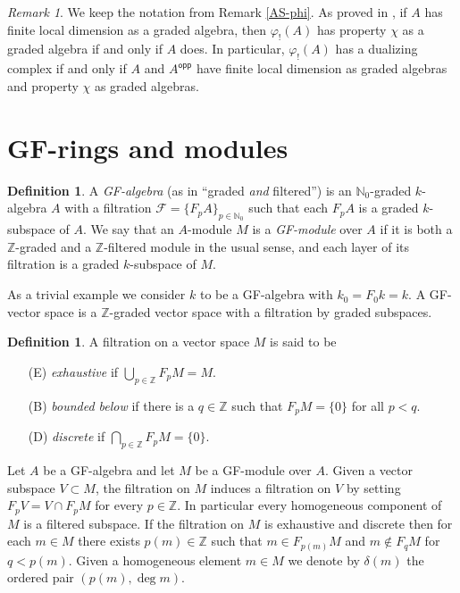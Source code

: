 \documentclass[11pt,fleqn]{article}
\theoremstyle{plain}
\theoremstyle{remark}
\newtheorem{Remark}[Theorem]{Remark}
\theoremstyle{definition}
\newtheorem{Definition}[Theorem]{Definition}
\newcommand\NN{\mathbb N}
\newcommand\ZZ{\mathbb Z}
\renewcommand\phi{\varphi}
\newcommand\F{\mathcal F}
\newcommand\opp{\mathsf{opp}}
\begin{document}
\begin{Remark}
  We keep the notation from Remark \ref{AS-phi}. As proved in \cite{RZ2}, if $A$ has
  finite local dimension as a graded algebra, then $\phi_!(A)$ has property $\chi$ as a
  graded algebra if and only if $A$ does. In particular, $\phi_!(A)$ has a dualizing
  complex if and only if $A$ and $A^\opp$ have finite local dimension as graded algebras
  and property $\chi$ as graded algebras.
\end{Remark}

\section{GF-rings and modules}
\begin{Definition}
	A \emph{GF-algebra} (as in ``graded \emph{and} filtered'') is an $\NN_0$-graded
	$k$-algebra $A$ with a filtration $\F= \{F_pA\}_{p \in \NN_0}$ such that each
	$F_pA$ is a graded $k$-subspace of $A$. We say that an $A$-module $M$ is a
	\emph{GF-module} over $A$ if it is both a $\ZZ$-graded and a $\ZZ$-filtered module 
	in the usual sense, and each layer of its filtration is a graded $k$-subspace of
	$M$.
\end{Definition}
As a trivial example we consider $k$ to be a GF-algebra with $k_0 = F_0k = k$. A GF-vector 
space is a $\ZZ$-graded vector space with a filtration by graded subspaces.

\begin{Definition}
A filtration on a vector space $M$ is said to be
\begin{enumerate}
	 \item[(E)] \emph{exhaustive} if $\displaystyle \bigcup_{p \in \ZZ}
	 	F_p M = M$.
	 \item[(B)] \emph{bounded below} if there is a $q \in \ZZ$ such that
		 $F_p M = \{0\}$ for all $p < q$.
	 \item[(D)] \emph{discrete} if $\displaystyle \bigcap_{p \in \ZZ}
	 	F_p M = \{0\}$.
\end{enumerate}
\end{Definition}
Let $A$ be a GF-algebra and let $M$ be a GF-module over $A$. Given a vector subspace $V
\subset M$, the filtration on $M$ induces a filtration on $V$ by setting $F_pV =
V \cap F_pM$ for every $p \in \ZZ$. In particular every homogeneous component of $M$ is a
filtered subspace. If the filtration on $M$ is exhaustive and discrete then for each $m \in M$
there exists $p(m) \in \ZZ$ such that $m \in F_{p(m)}M$ and $m \notin F_q M$ for $q < p(m)$.
Given a homogeneous element $m \in M$ we denote by $\delta(m)$ the ordered pair $(p(m),
\deg m)$.
\end{document}
